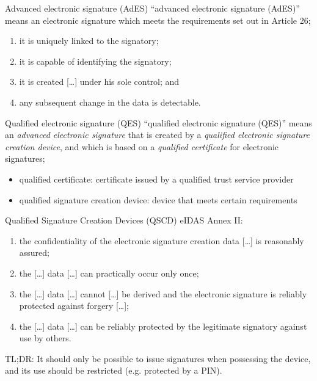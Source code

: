 \begin{frame}{Advanced electronic signature (AdES)}
  \enquote{advanced electronic signature (AdES)} means an electronic signature which meets the requirements set out in Article 26;
  \settowidth{\offset}{26.1}
  \addtolength{\leftmargini}{\offset}
  \begin{enumerate}[<+(1)->]
    \item[(26.a)] it is uniquely linked to the signatory;
    \item[(26.b)] it is capable of identifying the signatory;
    \item[(26.c)] it is created [\dots] under his sole control; and
    \item[(26.d)] [\dots] any subsequent change in the data is detectable.
  \end{enumerate}
\end{frame}

\begin{frame}{Qualified electronic signature (QES)}
  \enquote{qualified electronic signature (QES)} means an \emph{advanced electronic signature} that is created by a \emph{qualified electronic signature creation device}, and which is based on a \emph{qualified certificate} for electronic signatures;
  \begin{itemize}[<+(1)->]
    \item qualified certificate: certificate issued by a qualified trust service provider
    \item qualified signature creation device: device that meets certain requirements
  \end{itemize}
\end{frame}

\begin{frame}{Qualified Signature Creation Devices (QSCD)}
  \pause
  eIDAS Annex II:
  \settowidth{\offset}{1.a}
  \addtolength{\leftmargini}{\offset}
  \begin{enumerate}[<+(1)->]
    \item[(1.a)] the confidentiality of the electronic signature creation data [\dots] is reasonably assured;
    \item[(1.b)] the [\dots] data [\dots] can practically occur only once;
    \item[(1.c)] the [\dots] data [\dots] cannot [\dots] be derived and the electronic signature is reliably protected against forgery [\dots];
    \item[(1.d)] the [\dots] data [\dots] can be reliably protected by the legitimate signatory against use by others.
  \end{enumerate}

  \pause
  TL;DR: It should only be possible to issue signatures when possessing the device, and its use should be restricted (e.g. protected by a PIN).
\end{frame}

